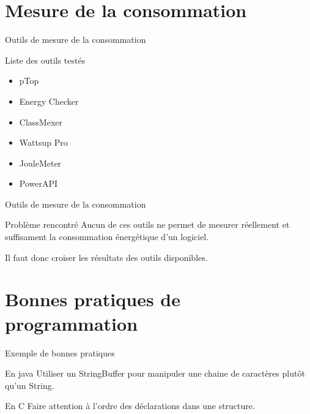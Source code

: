 \documentclass{beamer}
\begin{document}
    \section{Mesure de la consommation}
	\begin{frame}{Outils de mesure de la consommation}
	    \begin{block}{Liste des outils testés}
		\begin{itemize}
		    \item pTop
		    \item Energy Checker
		    \item ClassMexer
			\item Wattsup Pro
		    \item JouleMeter
		    \item PowerAPI
		\end{itemize}
	    \end{block}	
	\end{frame}
	\begin{frame}{Outils de mesure de la consommation}
		\begin{block}{Problème rencontré}
			Aucun de ces outils ne permet de mesurer réellement et suffisament la consommation énergétique d'un logiciel.
		\end{block}
		Il faut donc croiser les résultats des outils disponibles.
	\end{frame}
	
    \section{Bonnes pratiques de programmation}
	\begin{frame}{Exemple de bonnes pratiques}
    	    \begin{block}{En java}
		Utiliser un StringBuffer pour manipuler une chaine de caractères plutôt qu'un String.
	    \end{block}
    	    \begin{block}{En C}
		Faire attention à l'ordre des déclarations dans une structure.
	    \end{block}
	\end{frame}
	
\end{document}

